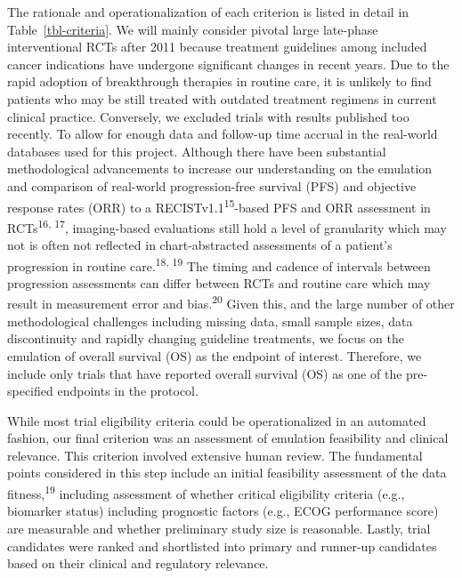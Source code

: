 \documentclass[
  letterpaper,
  DIV=11,
  numbers=noendperiod]{scrartcl}
\begin{document}
The rationale and operationalization of each criterion is listed in
detail in Table~\ref{tbl-criteria}. We will mainly consider pivotal
large late-phase interventional RCTs after 2011 because treatment
guidelines among included cancer indications have undergone significant
changes in recent years. Due to the rapid adoption of breakthrough
therapies in routine care, it is unlikely to find patients who may be
still treated with outdated treatment regimens in current clinical
practice. Conversely, we excluded trials with results published too
recently. To allow for enough data and follow-up time accrual in the
real-world databases used for this project. Although there have been
substantial methodological advancements to increase our understanding on
the emulation and comparison of real-world progression-free survival
(PFS) and objective response rates (ORR) to a
RECISTv1.1\textsuperscript{15}-based PFS and ORR assessment in
RCTs\textsuperscript{16, 17}, imaging-based evaluations still hold a
level of granularity which may not is often not reflected in
chart-abstracted assessments of a patient's progression in routine
care.\textsuperscript{18, 19} The timing and cadence of intervals
between progression assessments can differ between RCTs and routine care
which may result in measurement error and bias.\textsuperscript{20}
Given this, and the large number of other methodological challenges
including missing data, small sample sizes, data discontinuity and
rapidly changing guideline treatments, we focus on the emulation of
overall survival (OS) as the endpoint of interest. Therefore, we include
only trials that have reported overall survival (OS) as one of the
pre-specified endpoints in the protocol.

While most trial eligibility criteria could be operationalized in an
automated fashion, our final criterion was an assessment of emulation
feasibility and clinical relevance. This criterion involved extensive
human review. The fundamental points considered in this step include an
initial feasibility assessment of the data fitness,\textsuperscript{19}
including assessment of whether critical eligibility criteria (e.g.,
biomarker status) including prognostic factors (e.g., ECOG performance
score) are measurable and whether preliminary study size is reasonable.
Lastly, trial candidates were ranked and shortlisted into primary and
runner-up candidates based on their clinical and regulatory relevance.
\end{document}
